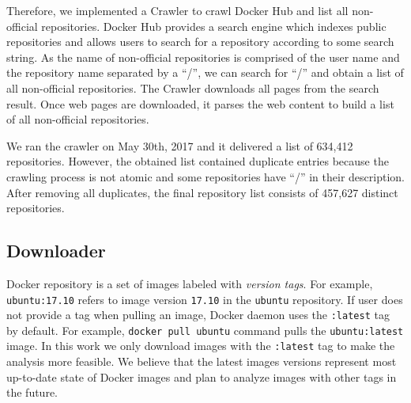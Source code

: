 Therefore, we implemented a Crawler to crawl Docker Hub and list all non-official
repositories.
%
Docker Hub provides a search engine which indexes public repositories and allows
users to search for a repository according to
some search string. 
%
As the name of non-official repositories is comprised
of the user name and the repository name separated by a ``/'',
we can search for ``/'' and obtain a list of all non-official
repositories.
%
%
%
The Crawler downloads all pages from the search result.
%
Once web pages are downloaded, it parses the web content to build a list of
all non-official repositories.




We ran the crawler on May 30th, 2017 and it delivered a list of 634,412 repositories.
%
However, the obtained list contained duplicate entries because 
the crawling process is not atomic and some repositories have ``/'' in their description.
%
After removing all duplicates, the final repository list consists of 457,627
distinct repositories. 
%


%
%
%

\subsection{Downloader}
\label{sec:downloader}

Docker repository is a set of images labeled with \emph{version tags}.
%
For example, \texttt{ubuntu:17.10} refers to image version \texttt{17.10} in the
\texttt{ubuntu} repository.
%
If user does not provide a tag when pulling an image, 
Docker daemon uses the \texttt{:latest} tag by default.
For example, \texttt{docker pull ubuntu} command pulls the
\texttt{ubuntu:latest} image.
%
In this work we only download images with the \texttt{:latest} tag to
make the analysis more feasible.  We believe that the latest
images versions represent most up-to-date state of  Docker images
%
and plan to analyze images with other tags in the future.



